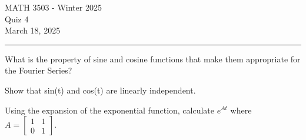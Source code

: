 \documentclass[12pt,letterpaper, onecolumn]{exam}
\begin{document}
\begingroup  
    \centering
    \LARGE MATH 3503 - Winter 2025\\
    \LARGE Quiz 4\\[0.5em]
    \large March 18, 2025\\[0.5em]
\endgroup
\rule{\textwidth}{0.4pt}
\pointsdroppedatright   %
\printanswers
\renewcommand{\solutiontitle}{\noindent\textbf{Ans:}\enspace}   %

\begin{questions}
    
    \question[3 Marks] What is the property of sine and cosine functions that make them appropriate for the Fourier Series?\droppoints

    \bigskip
    \bigskip
    \bigskip
    \bigskip
    \bigskip
    \bigskip
    \bigskip
    \bigskip
    \bigskip
    \bigskip
    \bigskip
    \bigskip
    \bigskip
    \bigskip
    \bigskip
    \bigskip
    \bigskip
    \bigskip
    
    \question[3 Marks] Show that sin(t) and cos(t) are linearly independent.\droppoints
    
    \pagebreak %
\thispagestyle{empty}   %
    
    \question[4 Marks] Using the expansion of the exponential function, calculate $e^{At}$ where $A = \begin{bmatrix} 1 & 1 \\ 0 & 1\end{bmatrix}$.\droppoints
    
\end{questions}
\end{document}
